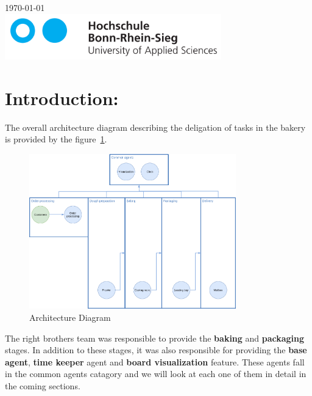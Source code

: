 \documentclass[12pt]{article}
\begin{document}
\begin{titlepage}
\begin{center}

{\large \today}\\[1cm] %

\includegraphics[width=3.7in]{Logo.png}\\%
\end{center}
\end{titlepage}
\pagebreak
\tableofcontents
\pagebreak
\section*{Introduction:}

The overall architecture diagram describing the deligation of tasks in the bakery is provided by the figure~\ref{fig:1}.

\begin{figure}[H]
  \centering
  \includegraphics[width=0.8\textwidth]{Architecture.png}
  \caption{Architecture Diagram}
  \label{fig:1}
\end{figure}

The right brothers team was responsible to provide the \textbf{baking} and \textbf{packaging} stages. In addition to these stages, it was also responsible for providing the \textbf{base agent}, \textbf{time keeper} agent and \textbf{board visualization} feature. These agents fall in the common agents catagory and we will look at each one of them in detail in the coming sections.
\end{document}
